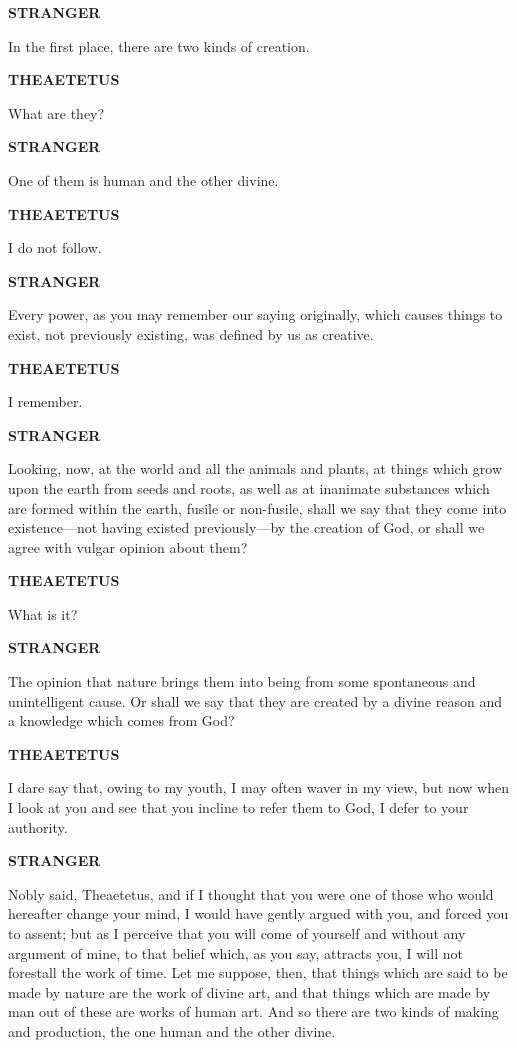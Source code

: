 \documentclass[11pt,letter]{article}
\begin{document}
\par \textbf{STRANGER}
\par   In the first place, there are two kinds of creation.

\par \textbf{THEAETETUS}
\par   What are they?

\par \textbf{STRANGER}
\par   One of them is human and the other divine.

\par \textbf{THEAETETUS}
\par   I do not follow.

\par \textbf{STRANGER}
\par   Every power, as you may remember our saying originally, which causes things to exist, not previously existing, was defined by us as creative.

\par \textbf{THEAETETUS}
\par   I remember.

\par \textbf{STRANGER}
\par   Looking, now, at the world and all the animals and plants, at things which grow upon the earth from seeds and roots, as well as at inanimate substances which are formed within the earth, fusile or non-fusile, shall we say that they come into existence—not having existed previously—by the creation of God, or shall we agree with vulgar opinion about them?

\par \textbf{THEAETETUS}
\par   What is it?

\par \textbf{STRANGER}
\par   The opinion that nature brings them into being from some spontaneous and unintelligent cause. Or shall we say that they are created by a divine reason and a knowledge which comes from God?

\par \textbf{THEAETETUS}
\par   I dare say that, owing to my youth, I may often waver in my view, but now when I look at you and see that you incline to refer them to God, I defer to your authority.

\par \textbf{STRANGER}
\par   Nobly said, Theaetetus, and if I thought that you were one of those who would hereafter change your mind, I would have gently argued with you, and forced you to assent; but as I perceive that you will come of yourself and without any argument of mine, to that belief which, as you say, attracts you, I will not forestall the work of time. Let me suppose, then, that things which are said to be made by nature are the work of divine art, and that things which are made by man out of these are works of human art. And so there are two kinds of making and production, the one human and the other divine.
\end{document}
